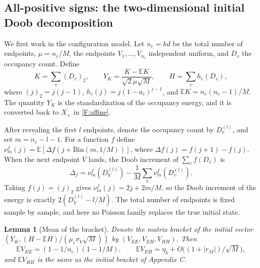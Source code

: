 \documentclass[a4paper,11pt]{article}
\newtheorem{lemma}[theorem]{Lemma}
\numberwithin{equation}{section}
\newcommand{\E}{\mathbb E}
\begin{document}
\subsection{All-positive signs: the two-dimensional initial Doob decomposition}

We first work in the configuration model. Let $n_e=kd$ be the total number of endpoints, $\mu=n_e/M$, the
endpoints $V_1,\ldots,V_{n_e}$ independent uniform, and $D_v$ the occupancy count. Define
\begin{equation}
K=\sum_v(D_v)_2,\qquad Y_K=\frac{K-\E K}{\sqrt2\mu\sqrt M},\qquad H=\sum_vh_c(D_v),\label{F:KH}
\end{equation}
where $(j)_2=j(j-1)$, $h_c(j)=j(1-a_c)^{j-1}$, and $\E K=n_e(n_e-1)/M$. The quantity $Y_K$ is the
standardization of the occupancy energy, and it is converted back to $X_+$ in \eqref{F:affine}.

After revealing the first $l$ endpoints, denote the occupancy count by $D_v^{(l)}$, and set $m=n_e-l-1$. For
a function $f$ define $\nu^f_m(j)=\E[\Delta f(j+\mathrm{Bin}(m,1/M))]$, where $\Delta f(j)=f(j+1)-f(j)$.
When the next endpoint $V$ lands, the Doob increment of $\sum_vf(D_v)$ is
\begin{equation}
\Delta_f=\nu^f_m(D_V^{(l)})-\frac1M\sum_v\nu^f_m(D_v^{(l)}).\label{F:doob}
\end{equation}
Taking $f(j)=(j)_2$ gives $\nu^f_m(j)=2j+2m/M$, so the Doob increment of the energy is exactly
$2(D_V^{(l)}-l/M)$. The total number of endpoints is fixed sample by sample, and here no Poisson family
replaces the true initial state.

\begin{lemma}[Mean of the bracket]\label{F:lem:bracket}
Denote the matrix bracket of the initial vector $(Y_K,(H-\E H)/(\mu_c\sigma_k\sqrt M))$ by
$(V_{EE},V_{EH},V_{HH})$. Then
\begin{equation}
\E V_{EE}=(1-1/n_e)(1-1/M),\qquad \E V_{EH}=\eta_k+O\bigl((1+|r_M|)/\sqrt M\bigr),\label{F:bracketmean}
\end{equation}
and $\E V_{HH}$ is the same as the initial bracket of Appendix C.
\end{lemma}
\end{document}
